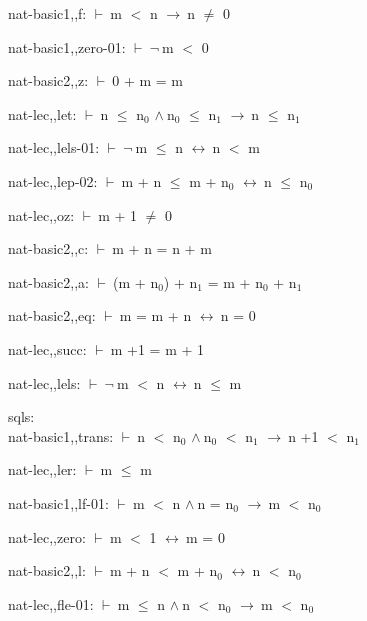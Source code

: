 \documentclass[a4paper]{article}
\newcommand{\Fol}{\mbox{$\vdash\ $}}
\newcommand{\Not}{\mbox{$\neg\ $}}
\newcommand{\And}{\mbox{$\wedge\ $}}
\newcommand{\Imp}{\mbox{$\rightarrow\ $}}
\newcommand{\Equiv}{\mbox{$\leftrightarrow\ $}}
\begin{document}
nat-basic1,,f: 
 \Fol m $<$ n \Imp n $\neq$ 0



nat-basic1,,zero-01: 
 \Fol \Not m $<$ 0



nat-basic2,,z: 
 \Fol 0 + m = m



nat-lec,,let: 
 \Fol n $\le$ $\mbox{n}_{0}$ \And $\mbox{n}_{0}$ $\le$ $\mbox{n}_{1}$ \Imp n $\le$ $\mbox{n}_{1}$



nat-lec,,lels-01: 
 \Fol \Not m $\le$ n \Equiv n $<$ m



nat-lec,,lep-02: 
 \Fol m + n $\le$ m + $\mbox{n}_{0}$ \Equiv n $\le$ $\mbox{n}_{0}$



nat-lec,,oz: 
 \Fol m + 1 $\neq$ 0



nat-basic2,,c: 
 \Fol m + n = n + m



nat-basic2,,a: 
 \Fol (m + $\mbox{n}_{0}$) + $\mbox{n}_{1}$ = m + $\mbox{n}_{0}$ + $\mbox{n}_{1}$



nat-basic2,,eq: 
 \Fol m = m + n \Equiv n = 0



nat-lec,,succ: 
 \Fol m +1 = m + 1



nat-lec,,lels: 
 \Fol \Not m $<$ n \Equiv n $\le$ m



\bigskip

sqls:\\ nat-basic1,,trans: 
 \Fol n $<$ $\mbox{n}_{0}$ \And $\mbox{n}_{0}$ $<$ $\mbox{n}_{1}$ \Imp n +1 $<$ $\mbox{n}_{1}$

nat-lec,,ler: 
 \Fol m $\le$ m



nat-basic1,,lf-01: 
 \Fol m $<$ n \And n = $\mbox{n}_{0}$ \Imp m $<$ $\mbox{n}_{0}$



nat-lec,,zero: 
 \Fol m $<$ 1 \Equiv m = 0



nat-basic2,,l: 
 \Fol m + n $<$ m + $\mbox{n}_{0}$ \Equiv n $<$ $\mbox{n}_{0}$



nat-lec,,fle-01: 
 \Fol m $\le$ n \And n $<$ $\mbox{n}_{0}$ \Imp m $<$ $\mbox{n}_{0}$
\end{document}
